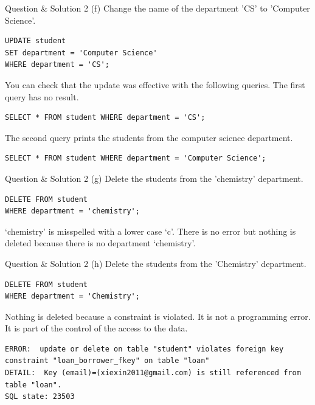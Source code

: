 \begin{frame}[fragile]{Question \& Solution 2 (f)}
Change the name of the department 'CS' to 'Computer Science'.

\begin{lstlisting}
UPDATE student
SET department = 'Computer Science'
WHERE department = 'CS';
\end{lstlisting}

You can check that the update was effective with the following queries.
The first query has no result.
\begin{lstlisting}
SELECT * FROM student WHERE department = 'CS';
\end{lstlisting}

The second query prints the students from the computer science department.
\begin{lstlisting}
SELECT * FROM student WHERE department = 'Computer Science';
\end{lstlisting}
\end{frame}

\begin{frame}[fragile]{Question \& Solution 2 (g)}
Delete the students from the 'chemistry' department.

\begin{lstlisting} 
DELETE FROM student 
WHERE department = 'chemistry';
\end{lstlisting}

`chemistry' is misspelled with a lower case `c'. There is no error but nothing is deleted because there is no department `chemistry'.
\end{frame}

\begin{frame}[fragile]{Question \& Solution 2 (h)}
Delete the students from the 'Chemistry' department.

\begin{lstlisting}
DELETE FROM student 
WHERE department = 'Chemistry';
\end{lstlisting}


Nothing is deleted because a constraint is violated. It is not a programming error. It is part of the control of the access to the data.
\begin{lstlisting}[style=error]
ERROR:  update or delete on table "student" violates foreign key constraint "loan_borrower_fkey" on table "loan"
DETAIL:  Key (email)=(xiexin2011@gmail.com) is still referenced from table "loan".
SQL state: 23503
\end{lstlisting}
\end{frame}


